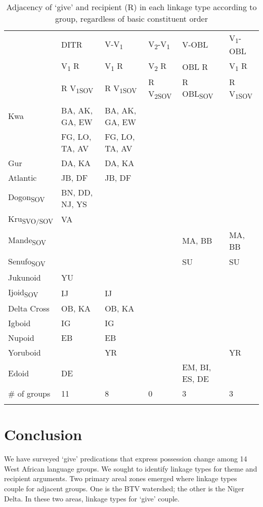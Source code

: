 \documentclass[output=paper,colorlinks,citecolor=brown]{langscibook}
\begin{document}
\begin{sidewaystable}
\caption{Adjacency of ‘give’ and recipient (R) in each linkage type according to group, regardless of basic constituent order}
\label{tab:LinkageRecipient}
 \begin{tabular}{llllll}
  \lsptoprule
& 	DITR &	V-V\textsubscript{1} & 	V\textsubscript{2}-V\textsubscript{1}&	V-OBL & V\textsubscript{1}-OBL \\
 & V\textsubscript{1} R & V\textsubscript{1} R & V\textsubscript{2} R & OBL R & V\textsubscript{1} R \\ 
& R V\textsubscript{1SOV} & R V\textsubscript{1SOV} & R V\textsubscript{2SOV} & R OBL\textsubscript{SOV} & R V\textsubscript{1SOV} \\
\midrule
Kwa	& BA, AK, GA, EW &	BA, AK, GA, EW	 & & & \\		
	& FG, LO, TA, AV	&FG, LO, TA, AV	 &&&\\		
Gur	& DA, KA &	DA, KA	& && \\		
Atlantic&	JB, DF&JB, DF		 &&& \\	
Dogon\textsubscript{SOV} &	BN, DD, NJ, YS		&&&& \\		
Kru\textsubscript{SVO/SOV} &	VA	&&&& \\			 
Mande\textsubscript{SOV}	& & 	&	&	MA, BB&	MA, BB \\
Senufo\textsubscript{SOV} && 		&	&	SU&	SU \\
Jukunoid	& YU	 &&&& \\			
Ijoid\textsubscript{SOV}& 	IJ	&IJ	&&&\\	
Delta Cross &	OB, KA	&OB, KA		&&&\\	
Igboid&	IG&	IG		&&&\\	
Nupoid	&EB&	EB&&&\\			
Yoruboid &	&	YR		&&&	YR \\
Edoid &	DE		&&	& EM, BI, ES, DE	& \\
\midrule
\# of groups 	&11&	8&	0	&3	&3 \\
  \lspbottomrule
 \end{tabular}
\end{sidewaystable}   


\section{Conclusion}

We have surveyed ‘give’ predications that express possession change among 14 West African language groups. We sought to identify linkage types for theme and recipient arguments. Two primary areal zones emerged where linkage types couple for adjacent groups. One is the BTV watershed; the other is the Niger Delta. In these two areas, linkage types for ‘give’ couple.
\end{document}
